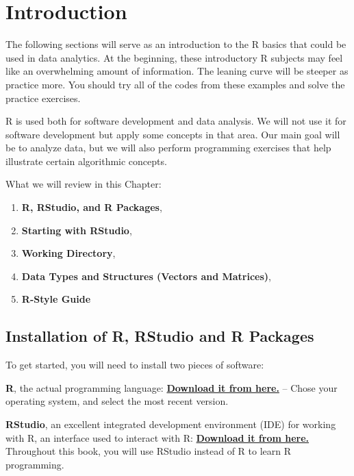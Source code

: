 \documentclass[
]{book}
\providecommand{\tightlist}{%
  \setlength{\itemsep}{0pt}\setlength{\parskip}{0pt}}
\theoremstyle{definition}
\theoremstyle{definition}
\theoremstyle{definition}
\theoremstyle{definition}
\theoremstyle{remark}
\begin{document}
\hypertarget{introduction}{%
\chapter{Introduction}\label{introduction}}

The following sections will serve as an introduction to the R basics that could be used in data analytics. At the beginning, these introductory R subjects may feel like an overwhelming amount of information. The leaning curve will be steeper as practice more. You should try all of the codes from these examples and solve the practice exercises.

R is used both for software development and data analysis. We will not use it for software development but apply some concepts in that area. Our main goal will be to analyze data, but we will also perform programming exercises that help illustrate certain algorithmic concepts.

What we will review in this Chapter:

\begin{enumerate}
\def\labelenumi{\arabic{enumi}.}
\tightlist
\item
  \textbf{R, RStudio, and R Packages},
\item
  \textbf{Starting with RStudio},
\item
  \textbf{Working Directory},
\item
  \textbf{Data Types and Structures (Vectors and Matrices)},
\item
  \textbf{R-Style Guide}
\end{enumerate}

\hypertarget{installation-of-r-rstudio-and-r-packages}{%
\section{Installation of R, RStudio and R Packages}\label{installation-of-r-rstudio-and-r-packages}}

To get started, you will need to install two pieces of software:

\textbf{R}, the actual programming language: \href{https://cran.r-project.org}{\textbf{Download it from here.}}
-- Chose your operating system, and select the most recent version.

\textbf{RStudio}, an excellent integrated development environment (IDE) for working with R, an interface used to interact with R: \href{https://www.rstudio.com}{\textbf{Download it from here.}} Throughout this book, you will use RStudio instead of R to learn R programming.
\end{document}
